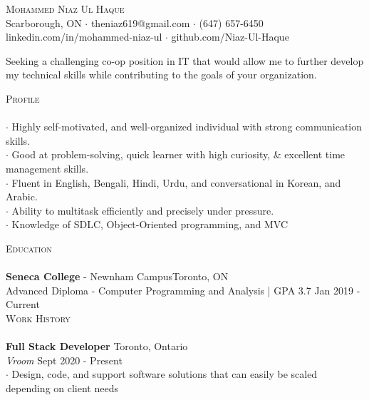 \documentclass[a4paper]{article}
\newcommand{\lineunder} {
    \vspace*{-8pt} \\
    \hspace*{-18pt} \hrulefill \\
}
\newcommand{\header} [1] {
    {\hspace*{-18pt}\vspace*{6pt} \textsc{#1}}
    \vspace*{-6pt} \lineunder
}
\begin{document}
\vspace*{-40pt}

    

\vspace*{-10pt}
\begin{center}
	{\Huge \scshape {Mohammed Niaz Ul Haque}}\\
	Scarborough, ON $\cdot$ theniaz619@gmail.com $\cdot$ (647) 657-6450\\
	linkedin.com/in/mohammed-niaz-ul $\cdot$ github.com/Niaz-Ul-Haque\\
\end{center}

\text Seeking a challenging co-op position in IT that would allow me to further develop my technical skills while contributing to the goals of your organization. \\
\vspace{2mm}

{\large\header{Profile}}\vspace{0.3mm}
$\cdot$ Highly self-motivated, and well-organized individual with  strong communication skills.\\
$\cdot$ Good at problem-solving, quick learner with high curiosity, \& excellent time management skills.\\
$\cdot$ Fluent in English, Bengali, Hindi, Urdu, and conversational in Korean, and Arabic.\\
$\cdot$ Ability to multitask efficiently and precisely under pressure.\\
$\cdot$ Knowledge of SDLC, Object-Oriented programming, and MVC\\
\vspace{2mm}

{\large\header{Education}}
\textbf{Seneca College} - Newnham Campus\hfill Toronto, ON\\
{Advanced Diploma} - Computer Programming and Analysis | GPA 3.7 \hfill Jan 2019 - Current\\

\vspace{2mm}
{\large\header{Work History}}
\vspace{0.6mm}
\textbf{Full Stack Developer} \hfill Toronto, Ontario\\
\textit{Vroom} \hfill Sept 2020 - Present\\\vspace*{0.5mm}
$\cdot$ Design, code, and support software solutions that can easily be scaled depending on client needs
\end{document}
